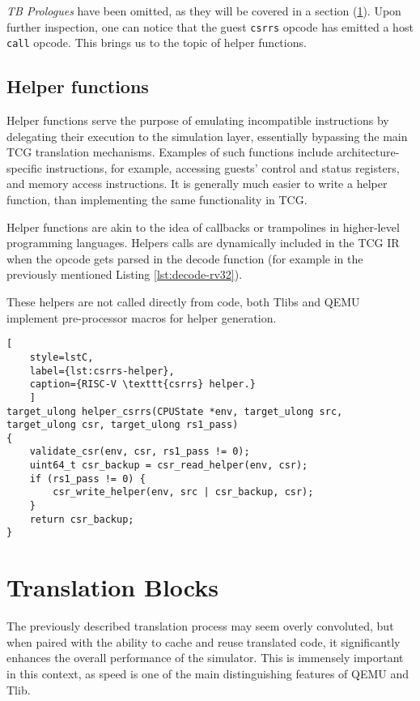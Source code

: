 \noindent
\textit{TB Prologues} have been omitted, as they will be covered in a section (\ref{sect:transltion-blocks}).
Upon further inspection, one can notice that the guest \texttt{csrrs} opcode has emitted a host \texttt{call} opcode.
This brings us to the topic of helper functions.

\pagebreak
\subsection{Helper functions}
\label{ssect:helper-functions}

Helper functions serve the purpose of emulating incompatible instructions by delegating their execution to the
simulation layer, essentially bypassing the main TCG translation mechanisms. Examples of such functions include
architecture-specific instructions, for example, accessing guests' control and status registers, and memory access
instructions. It is generally much easier to write a helper function, than implementing the same functionality in TCG.

Helper functions are akin to the idea of callbacks or trampolines in higher-level programming languages. Helpers calls
are dynamically included in the TCG IR when the opcode gets parsed in the decode function (for example in the previously
mentioned Listing \ref{lst:decode-rv32}).

These helpers are not called directly from code, both Tlibs and QEMU implement pre-processor macros for helper generation.


\begin{lstlisting}[
    style=lstC,
    label={lst:csrrs-helper},
    caption={RISC-V \texttt{csrrs} helper.}
    ]
target_ulong helper_csrrs(CPUState *env, target_ulong src, target_ulong csr, target_ulong rs1_pass)
{
    validate_csr(env, csr, rs1_pass != 0);
    uint64_t csr_backup = csr_read_helper(env, csr);
    if (rs1_pass != 0) {
        csr_write_helper(env, src | csr_backup, csr);
    }
    return csr_backup;
}
\end{lstlisting}

\section{Translation Blocks}
\label{sect:transltion-blocks}

The previously described translation process may seem overly convoluted, but when paired with the ability to cache and
reuse translated code, it significantly enhances the overall performance of the simulator. This is immensely important
in this context, as speed is one of the main distinguishing features of QEMU and Tlib.

